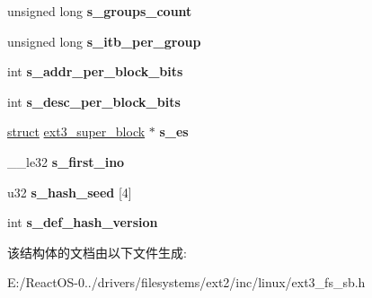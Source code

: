 \begin{DoxyCompactItemize}
\mbox{\label{structext3__sb__info_ae06f353a2fc9523ae8f2745ecfa1243a}} 
unsigned long {\bfseries s\+\_\+groups\+\_\+count}
\item 
\mbox{\label{structext3__sb__info_a6e1da79b2f9c10e3f2cfdbc3b0d5f8ef}} 
unsigned long {\bfseries s\+\_\+itb\+\_\+per\+\_\+group}
\item 
\mbox{\label{structext3__sb__info_a070223c3ed3b614a6e7eaf11e495b07a}} 
int {\bfseries s\+\_\+addr\+\_\+per\+\_\+block\+\_\+bits}
\item 
\mbox{\label{structext3__sb__info_aeb01b60b8873ec333f667181b4dc6d6c}} 
int {\bfseries s\+\_\+desc\+\_\+per\+\_\+block\+\_\+bits}
\item 
\mbox{\label{structext3__sb__info_a4744f03b89b75eedd3b99bd517358623}} 
\hyperlink{interfacestruct}{struct} \hyperlink{structext3__super__block}{ext3\+\_\+super\+\_\+block} $\ast$ {\bfseries s\+\_\+es}
\item 
\mbox{\label{structext3__sb__info_a285737af0d86ac6e6243ea431c6ad698}} 
\+\_\+\+\_\+le32 {\bfseries s\+\_\+first\+\_\+ino}
\item 
\mbox{\label{structext3__sb__info_ad54b87ab483f80e047d67e6e11e46b0d}} 
u32 {\bfseries s\+\_\+hash\+\_\+seed} \mbox{[}4\mbox{]}
\item 
\mbox{\label{structext3__sb__info_a6a9f46212f6201fd2da7341a1721ec8e}} 
int {\bfseries s\+\_\+def\+\_\+hash\+\_\+version}
\end{DoxyCompactItemize}


该结构体的文档由以下文件生成\+:\begin{DoxyCompactItemize}
\item 
E\+:/\+React\+O\+S-\/0../drivers/filesystems/ext2/inc/linux/ext3\+\_\+fs\+\_\+sb.\+h\end{DoxyCompactItemize}
